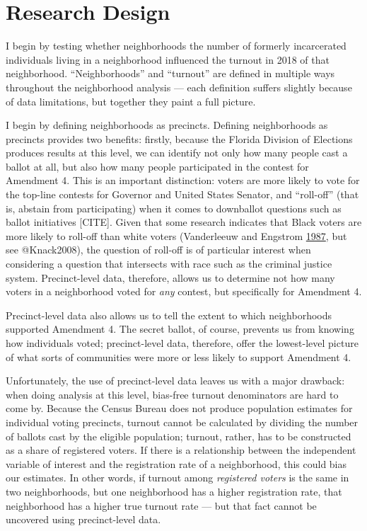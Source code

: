\documentclass[
  12pt,
]{article}
\begin{document}
\hypertarget{research-design}{%
\section*{Research Design}\label{research-design}}

I begin by testing whether neighborhoods the number of formerly incarcerated individuals living in a neighborhood influenced the turnout in 2018 of that neighborhood. ``Neighborhoods'' and ``turnout'' are defined in multiple ways throughout the neighborhood analysis --- each definition suffers slightly because of data limitations, but together they paint a full picture.

I begin by defining neighborhoods as precincts. Defining neighborhoods as precincts provides two benefits: firstly, because the Florida Division of Elections produces results at this level, we can identify not only how many people cast a ballot at all, but also how many people participated in the contest for Amendment 4. This is an important distinction: voters are more likely to vote for the top-line contests for Governor and United States Senator, and ``roll-off'' (that is, abstain from participating) when it comes to downballot questions such as ballot initiatives {[}CITE{]}. Given that some research indicates that Black voters are more likely to roll-off than white voters (Vanderleeuw and Engstrom \protect\hyperlink{ref-Vanderleeuw1987}{1987}, but see @Knack2008), the question of roll-off is of particular interest when considering a question that intersects with race such as the criminal justice system. Precinct-level data, therefore, allows us to determine not how many voters in a neighborhood voted for \emph{any} contest, but specifically for Amendment 4.

Precinct-level data also allows us to tell the extent to which neighborhoods supported Amendment 4. The secret ballot, of course, prevents us from knowing how individuals voted; precinct-level data, therefore, offer the lowest-level picture of what sorts of communities were more or less likely to support Amendment 4.

Unfortunately, the use of precinct-level data leaves us with a major drawback: when doing analysis at this level, bias-free turnout denominators are hard to come by. Because the Census Bureau does not produce population estimates for individual voting precincts, turnout cannot be calculated by dividing the number of ballots cast by the eligible population; turnout, rather, has to be constructed as a share of registered voters. If there is a relationship between the independent variable of interest and the registration rate of a neighborhood, this could bias our estimates. In other words, if turnout among \emph{registered voters} is the same in two neighborhoods, but one neighborhood has a higher registration rate, that neighborhood has a higher true turnout rate --- but that fact cannot be uncovered using precinct-level data.
\end{document}
